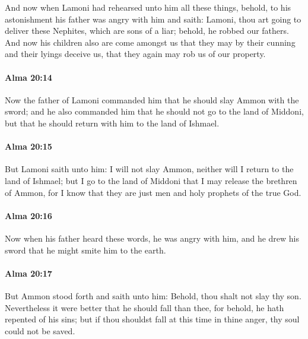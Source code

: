 			And now when Lamoni had rehearsed unto him all these things,
			behold, to his astonishment his father was angry with him and saith:
			Lamoni, thou art going to deliver these Nephites, which are sons of a liar;
			behold, he robbed our fathers.
			And now his children also are come amongst us
			that they may by their cunning and their lyings deceive us,
			that they again may rob us of our property.

		\paragraph{Alma 20:14} %
			\label{ALMA-20-14}

			Now the father of Lamoni commanded him
			that he should slay Ammon with the sword;
			and he also commanded him
			that he should not go to the land of Middoni,
			but that he should return with him to the land of Ishmael.

		\paragraph{Alma 20:15} %
			\label{ALMA-20-15}

			But Lamoni saith unto him:
			I will not slay Ammon,
			neither will I return to the land of Ishmael;
			but I go to the land of Middoni that I may release the brethren of Ammon,
			for I know that they are just men and holy prophets of the true God.

		\paragraph{Alma 20:16} %
			\label{ALMA-20-16}

			Now when his father heard these words,
			he was angry with him,
			and he drew his sword that he might smite him to the earth.

		\paragraph{Alma 20:17} %
			\label{ALMA-20-17}

			But Ammon stood forth and saith unto him:
			Behold, thou shalt not slay thy son.
			Nevertheless it were better that he should fall than thee,
			for behold, he hath repented of his sins;
			but if thou shouldst fall at this time in thine anger,
			thy soul could not be saved.

